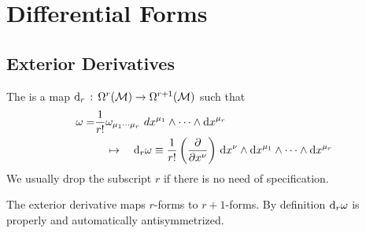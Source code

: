 \documentclass[a4paper, 10pt]{article}
\begin{document}
\setcounter{section}{6}
\section{Differential Forms}

\setcounter{subsection}{1}
\subsection{Exterior Derivatives}

\setcounter{theorem}{13}

\begin{definition}
    The  is a map $\mathrm{d}_{r} \,:\, \Omega^{r}(\mathcal{M}) \rightarrow \Omega^{r+1}(\mathcal{M})$ such that
    \begin{align*}
        \omega = & \frac{1}{r!}\omega_{\mu_{1}\cdots\mu_{r}}\,\,d{x}^{\mu_{1}} \wedge \cdots \wedge \mathrm{d}{x}^{\mu_{r}} \\
        &\quad \mapsto \quad \mathrm{d}_{r}\omega \equiv \frac{1}{r!} \left(\frac{\partial}{\partial{x}^{\nu}}\right) \, \mathrm{d}{x}^{\nu} \wedge \mathrm{d}{x}^{\mu_{1}} \wedge \cdots \wedge \mathrm{d}{x}^{\mu_{r}}
    \end{align*}
    We usually drop the subscript $r$ if there is no need of specification.
\end{definition}

\begin{remark}
    The exterior derivative maps $r$-forms to $r+1$-forms. By definition $\mathrm{d}_{r}\omega$ is properly and automatically antisymmetrized.
\end{remark}
\end{document}
